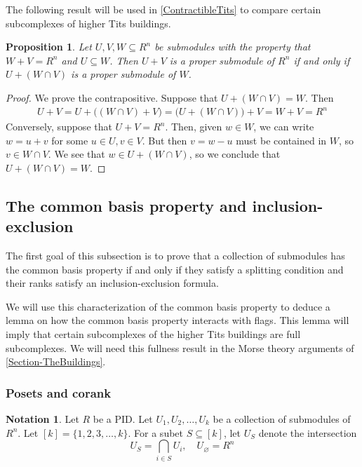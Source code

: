 \documentclass[a4paper]{amsart}
\numberwithin{theoremcounter}{section}
\newtheorem{proposition}[propositionauto]{Proposition}
\theoremstyle{definition}
\newtheorem{notation}[notationauto]{Notation}
\theoremstyle{remark}
\begin{document}
The following result will be used in \autoref{ContractibleTits} to compare certain subcomplexes of higher Tits buildings.

\begin{proposition}\label{mapfdefined}
Let $U,V, W \subseteq R^n$ be submodules with the property that $W+V = R^n$ and $U \subseteq W$. Then $U+V$ is a proper submodule of $R^n$ if and only if $U+(W \cap V)$ is a proper submodule of $W$. 
\end{proposition} 

\begin{proof} We prove the contrapositive. Suppose that $U+(W \cap V) =W.$ Then
\begin{align*}
U + V = U + \big((W \cap V)  +V\big) = \big(U +(W \cap V) ) + V = W+V = R^n 
\end{align*}
Conversely, suppose that  $U+V=R^n$. Then, given $w \in W$, we can write $w = u+v$ for some $u\in U, v \in V$. But then $v  =w-u$ must be contained in $W$, so $v \in W \cap V$.  We see that $w \in U+(W \cap V)$, so we conclude that $U+(W \cap V) = W$. 
\end{proof} 




\subsection{The common basis property and inclusion-exclusion} 

The first goal of this subsection is to prove that a collection of submodules has the common basis property if and only if they satisfy a splitting condition and their ranks satisfy an inclusion-exclusion formula. 

We will use this characterization of the common basis property to deduce a lemma on how the common basis property interacts with flags. This lemma will imply that certain subcomplexes of the higher Tits buildings are full subcomplexes. We will need this fullness result in the Morse theory arguments of \autoref{Section-TheBuildings}.  

\subsubsection{Posets and corank} 




\begin{notation}  Let $R$ be a PID. Let $U_1, U_2, \dots, U_k$ be a collection of submodules of $R^n$. Let $[k]=\{1, 2, 3, \dots, k\}$. For a subet $S \subseteq [k]$, let $U_S$ denote the intersection
$$ U_S = \bigcap_{i \in S} U_i, \quad U_{\varnothing} = R^n$$
\end{notation} 
\end{document}
